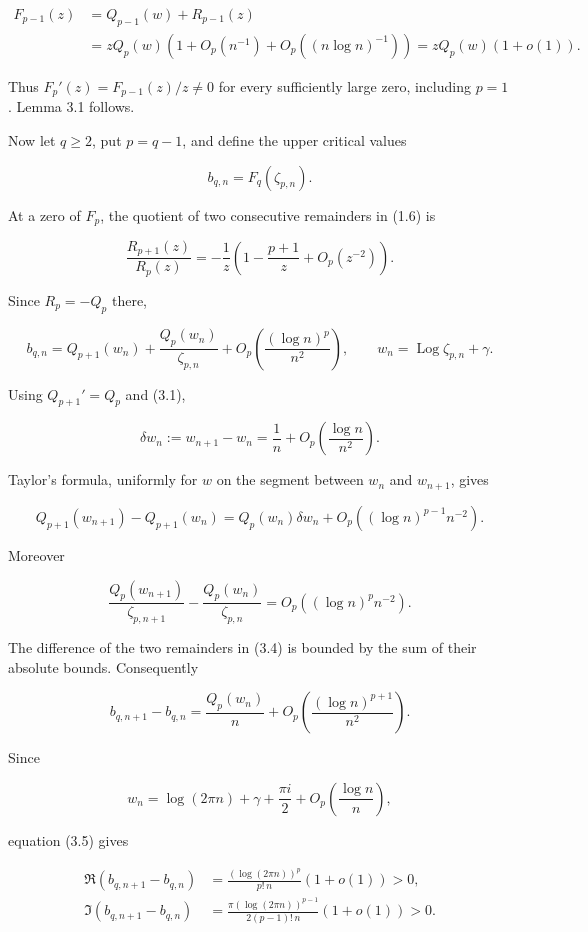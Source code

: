 \documentclass[11pt]{article}
\DeclareMathOperator{\Log}{Log}
\theoremstyle{keio}
\theoremstyle{definition}
\theoremstyle{remark}
\begin{document}
\[
 \begin{aligned}
 F_{p-1}(z)
 &=Q_{p-1}(w)+R_{p-1}(z)\\
 &=zQ_p(w)\left(1+O_p(n^{-1})
   +O_p((n\log n)^{-1})\right)
 =zQ_p(w)(1+o(1)).
 \end{aligned}
\tag{Inv-3.3}
\]

Thus \(F_p'(z)=F_{p-1}(z)/z\ne0\) for every sufficiently large zero,
including \(p=1\). Lemma 3.1 follows.

Now let \(q\geq2\), put \(p=q-1\), and define the upper critical values

\[
 b_{q,n}=F_q(\zeta_{p,n}).
\]

At a zero of \(F_p\), the quotient of two consecutive remainders in (1.6)
is

\[
 \frac{R_{p+1}(z)}{R_p(z)}
 =-\frac1z\left(1-\frac{p+1}{z}+O_p(z^{-2})\right).
\]

Since \(R_p=-Q_p\) there,

\[
 b_{q,n}=Q_{p+1}(w_n)+\frac{Q_p(w_n)}{\zeta_{p,n}}
 +O_p\!\left(\frac{(\log n)^p}{n^2}\right),
 \qquad w_n=\Log\zeta_{p,n}+\gamma.
\tag{Inv-3.4}
\]

Using \(Q_{p+1}'=Q_p\) and (3.1),

\[
 \delta w_n:=w_{n+1}-w_n
 =\frac1n+O_p\!\left(\frac{\log n}{n^2}\right).
\]

Taylor's formula, uniformly for \(w\) on the segment between \(w_n\) and
\(w_{n+1}\), gives

\[
 Q_{p+1}(w_{n+1})-Q_{p+1}(w_n)
 =Q_p(w_n)\delta w_n+O_p((\log n)^{p-1}n^{-2}).
\]

Moreover

\[
 \frac{Q_p(w_{n+1})}{\zeta_{p,n+1}}
 -\frac{Q_p(w_n)}{\zeta_{p,n}}
 =O_p((\log n)^p n^{-2}).
\]

The difference of the two remainders in (3.4) is bounded by the sum of
their absolute bounds. Consequently

\[
 b_{q,n+1}-b_{q,n}
 =\frac{Q_p(w_n)}n
 +O_p\!\left(\frac{(\log n)^{p+1}}{n^2}\right).
\tag{Inv-3.5}
\]

Since

\[
 w_n=\log(2\pi n)+\gamma+\frac{\pi i}{2}
 +O_p\!\left(\frac{\log n}{n}\right),
\]

equation (3.5) gives

\[
 \begin{aligned}
 \Re(b_{q,n+1}-b_{q,n})
 &=\frac{(\log(2\pi n))^p}{p!\,n}(1+o(1))>0,\\
 \Im(b_{q,n+1}-b_{q,n})
 &=\frac{\pi(\log(2\pi n))^{p-1}}
 {2(p-1)!\,n}(1+o(1))>0.
 \end{aligned}
\tag{Inv-3.6}
\]
\end{document}
